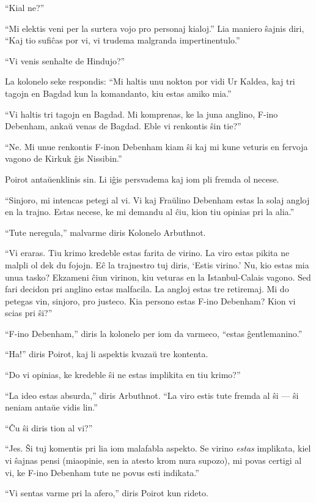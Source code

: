 ``Kial ne?''

``Mi elektis veni per la surtera vojo pro personaj kialoj.'' Lia maniero ŝajnis diri, ``Kaj tio sufiĉas por vi, vi trudema malgranda impertinentulo.''

``Vi venis senhalte de Hindujo?''

La kolonelo seke respondis: ``Mi haltis unu nokton por vidi Ur Kaldea, kaj tri tagojn en Bagdad kun la komandanto, kiu estas amiko mia.''

``Vi haltis tri tagojn en Bagdad. Mi komprenas, ke la juna anglino, F-ino Debenham, ankaŭ venas de Bagdad. Eble vi renkontis ŝin tie?''

``Ne. Mi unue renkontis F-inon Debenham kiam ŝi kaj mi kune veturis en fervoja vagono de Kirkuk ĝis Nissibin.''

Poirot antaŭenklinis sin. Li iĝis persvadema kaj iom pli fremda ol necese.

``Sinjoro, mi intencas petegi al vi. Vi kaj Fraŭlino Debenham estas la solaj angloj en la trajno. Estas necese, ke mi demandu al ĉiu, kion tiu opinias pri la alia.''

``Tute neregula,'' malvarme diris Kolonelo Arbuthnot.

``Vi eraras. Tiu krimo kredeble estas farita de virino. La viro estas pikita ne malpli ol dek du fojojn. Eĉ la trajnestro tuj diris, `Estis virino.' Nu, kio estas mia unua tasko? Ekzameni ĉiun virinon, kiu veturas en la Istanbul-Calais vagono. Sed fari decidon pri anglino estas malfacila. La angloj estas tre retiremaj. Mi do petegas vin, sinjoro, pro justeco. Kia persono estas F-ino Debenham? Kion vi scias pri ŝi?''

``F-ino Debenham,'' diris la kolonelo per iom da varmeco, ``estas ĝentlemanino.''

``Ha!'' diris Poirot, kaj li aspektis kvazaŭ tre kontenta.

``Do vi opinias, ke kredeble ŝi ne estas implikita en tiu krimo?''

``La ideo estas absurda,'' diris Arbuthnot. ``La viro estis tute fremda al ŝi --- ŝi neniam antaŭe vidis lin.''

``Ĉu ŝi diris tion al vi?''

``Jes. Ŝi tuj komentis pri lia iom malafabla aspekto. Se virino \emph{estas} implikata, kiel vi ŝajnas pensi (miaopinie, sen ia atesto krom nura supozo), mi povas certigi al vi, ke F-ino Debenham tute ne povus esti indikata.''

``Vi sentas varme pri la afero,'' diris Poirot kun rideto.

